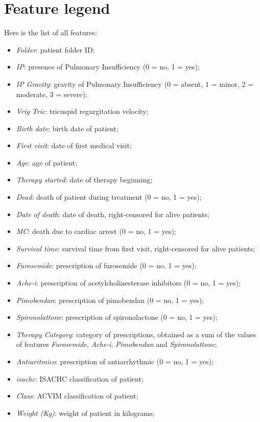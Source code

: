 \documentclass[12pt]{report}
\begin{document}
\section{Feature legend}
Here is the list of all features:
\begin{itemize}
\item \textit{Folder}: patient folder ID;
\item \textit{IP}: presence of Pulmonary Insufficiency (0 = no, 1 = yes);
\item \textit{IP Gravity}: gravity of Pulmonary Insufficiency (0 = absent, 1 = minor, 2 = moderate, 3 = severe);
\item \textit{Vrig Tric}: tricuspid regurgitation velocity;
\item \textit{Birth date}: birth date of patient;
\item \textit{First visit}: date of first medical visit;
\item \textit{Age}: age of patient;
\item \textit{Therapy started}: date of therapy beginning;
\item \textit{Dead}: death of patient during treatment (0 = no, 1 = yes);
\item \textit{Date of death}: date of death, right-censored for alive patients;
\item \textit{MC}: death due to cardiac arrest (0 = no, 1 = yes);
\item \textit{Survival time}: survival time from first visit, right-censored for alive patients;
\item \textit{Furosemide}: prescription of furosemide (0 = no, 1 = yes);
\item \textit{Ache-i}: prescription of acetylcholinesterase inhibitors (0 = no, 1 = yes);
\item \textit{Pimobendan}: prescription of pimobendan (0 = no, 1 = yes);
\item \textit{Spironolattone}: prescription of spironolactone (0 = no, 1 = yes);
\item \textit{Therapy Category}: category of prescriptions, obtained as a sum of the values of features \textit{Furosemide}, \textit{Ache-i}, \textit{Pimobendan} and \textit{Spironolattone};
\item \textit{Antiaritmico}: prescription of antiarrhythmic (0 = no, 1 = yes);
\item \textit{isachc}: ISACHC classification of patient;
\item \textit{Class}: ACVIM classification of patient;
\item \textit{Weight (Kg)}: weight of patient in kilograms;

\end{itemize}
\end{document}
